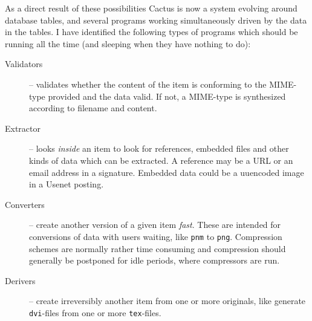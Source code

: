 As a direct result of these possibilities Cactus is now a system
evolving around database tables, and several programs working
simultaneously driven by the data in the tables.  I have identified
the following types of programs which should be running all the time
(and sleeping when they have nothing to do):

\begin{description}

\item[Validators] -- validates whether the content
  of the item is conforming to the MIME-type provided and
  the data valid.  If not, a MIME-type is synthesized
  according to filename and content.




\item[Extractor] -- looks \textit{inside} an item to look
  for references, embedded files and other kinds of data
  which can be extracted.  A reference may be a URL or an
  email address in a signature.  Embedded data could be a
  uuencoded image in a Usenet posting.

\item[Converters] -- create another version of a given item
  \textit{fast}.  These are intended for conversions of data
  with users waiting, like \texttt{pnm} to \texttt{png}.
  Compression schemes are normally rather time consuming and
  compression should generally be postponed for idle
  periods, where compressors are run.



\item[Derivers] -- create irreversibly
another item from one or more
  originals, like generate \texttt{dvi}-files
  from one or more \texttt{tex}-files.



\end{description}
